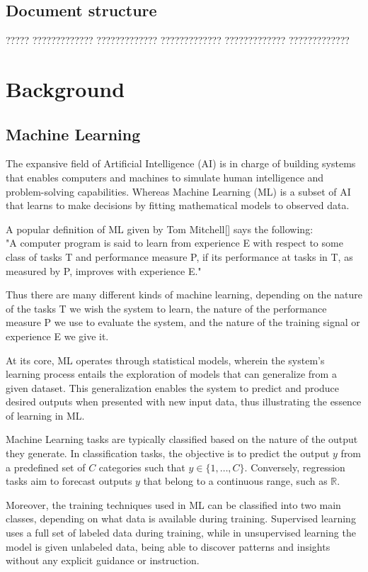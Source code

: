 \documentclass[11pt,english,listoffigures,listoftables]{tfgetsinf}
\begin{document}
\section{Document structure}

????? ????????????? ????????????? ????????????? ????????????? ????????????? 

\chapter{Background}

\section{Machine Learning}

The expansive field of Artificial Intelligence (AI) is in charge of building systems that enables computers and machines to simulate human intelligence and problem-solving capabilities. Whereas Machine Learning (ML) is a subset of AI that learns to make decisions by fitting mathematical models to observed data.

A popular definition of ML given by Tom Mitchell[] says the following:\\
"A computer program is said to learn from experience E with respect to some class of tasks T and performance measure P, if its performance at tasks in T, as measured by P, improves with experience E."

Thus there are many different kinds of machine learning, depending on the nature of the tasks T we
wish the system to learn, the nature of the performance measure P we use to evaluate the system,
and the nature of the training signal or experience E we give it.

At its core, ML operates through statistical models, wherein the system's learning process entails the exploration of models that can generalize from a given dataset. This generalization enables the system to predict and produce desired outputs when presented with new input data, thus illustrating the essence of learning in ML.

Machine Learning tasks are typically classified based on the nature of the output they generate. In classification tasks, the objective is to predict the output \( y \) from a predefined set of \( C \) categories such that $y \in \{1, \ldots, C\}$. Conversely, regression tasks aim to forecast outputs \( y \) that belong to a continuous range, such as $\mathbb{R}$.

Moreover, the training techniques used in ML can be classified into two main classes, depending on what data is available during training. Supervised learning uses a full set of labeled data during training, while in unsupervised learning the model is given unlabeled data, being able to discover patterns and insights without any explicit guidance or instruction.
\end{document}
